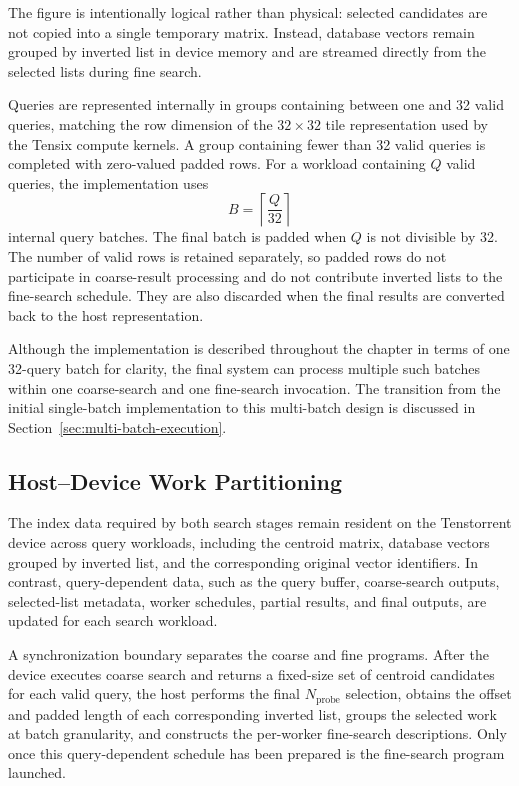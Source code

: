The figure is intentionally logical rather than physical: selected candidates are not copied into a single temporary matrix. Instead, database vectors remain grouped by inverted list in device memory and are streamed directly from the selected lists during fine search.

Queries are represented internally in groups containing between one and 32 valid queries, matching the row dimension of the \(32\times32\) tile representation used by the Tensix compute kernels. A group containing fewer than 32 valid queries is completed with zero-valued padded rows. For a workload containing \(Q\) valid queries, the implementation uses
\begin{equation}
B=\left\lceil\frac{Q}{32}\right\rceil
\end{equation}
internal query batches. The final batch is padded when \(Q\) is not divisible by 32. The number of valid rows is retained separately, so padded rows do not participate in coarse-result processing and do not contribute inverted lists to the fine-search schedule. They are also discarded when the final results are converted back to the host representation.

Although the implementation is described throughout the chapter in terms of one 32-query batch for clarity, the final system can process multiple such batches within one coarse-search and one fine-search invocation. The transition from the initial single-batch implementation to this multi-batch design is discussed in Section~\ref{sec:multi-batch-execution}.

\subsection{Host--Device Work Partitioning}
\label{subsec:host-device-responsibilities}

The index data required by both search stages remain resident on the Tenstorrent device across query workloads, including the centroid matrix, database vectors grouped by inverted list, and the corresponding original vector identifiers. In contrast, query-dependent data, such as the query buffer, coarse-search outputs, selected-list metadata, worker schedules, partial results, and final outputs, are updated for each search workload.

A synchronization boundary separates the coarse and fine programs. After the device executes coarse search and returns a fixed-size set of centroid candidates for each valid query, the host performs the final \(N_{\mathrm{probe}}\) selection, obtains the offset and padded length of each corresponding inverted list, groups the selected work at batch granularity, and constructs the per-worker fine-search descriptions. Only once this query-dependent schedule has been prepared is the fine-search program launched.

